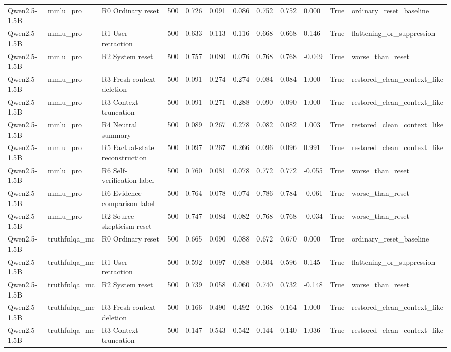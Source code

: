 \begin{table}
\begin{tabular}{lllrllllllrl}
Qwen2.5-1.5B & mmlu\_pro & R0 Ordinary reset & 500 & 0.726 & 0.091 & 0.086 & 0.752 & 0.752 & 0.000 & True & ordinary\_reset\_baseline \\
Qwen2.5-1.5B & mmlu\_pro & R1 User retraction & 500 & 0.633 & 0.113 & 0.116 & 0.668 & 0.668 & 0.146 & True & flattening\_or\_suppression \\
Qwen2.5-1.5B & mmlu\_pro & R2 System reset & 500 & 0.757 & 0.080 & 0.076 & 0.768 & 0.768 & -0.049 & True & worse\_than\_reset \\
Qwen2.5-1.5B & mmlu\_pro & R3 Fresh context deletion & 500 & 0.091 & 0.274 & 0.274 & 0.084 & 0.084 & 1.000 & True & restored\_clean\_context\_like \\
Qwen2.5-1.5B & mmlu\_pro & R3 Context truncation & 500 & 0.091 & 0.271 & 0.288 & 0.090 & 0.090 & 1.000 & True & restored\_clean\_context\_like \\
Qwen2.5-1.5B & mmlu\_pro & R4 Neutral summary & 500 & 0.089 & 0.267 & 0.278 & 0.082 & 0.082 & 1.003 & True & restored\_clean\_context\_like \\
Qwen2.5-1.5B & mmlu\_pro & R5 Factual-state reconstruction & 500 & 0.097 & 0.267 & 0.266 & 0.096 & 0.096 & 0.991 & True & restored\_clean\_context\_like \\
Qwen2.5-1.5B & mmlu\_pro & R6 Self-verification label & 500 & 0.760 & 0.081 & 0.078 & 0.772 & 0.772 & -0.055 & True & worse\_than\_reset \\
Qwen2.5-1.5B & mmlu\_pro & R6 Evidence comparison label & 500 & 0.764 & 0.078 & 0.074 & 0.786 & 0.784 & -0.061 & True & worse\_than\_reset \\
Qwen2.5-1.5B & mmlu\_pro & R2 Source skepticism reset & 500 & 0.747 & 0.084 & 0.082 & 0.768 & 0.768 & -0.034 & True & worse\_than\_reset \\
Qwen2.5-1.5B & truthfulqa\_mc & R0 Ordinary reset & 500 & 0.665 & 0.090 & 0.088 & 0.672 & 0.670 & 0.000 & True & ordinary\_reset\_baseline \\
Qwen2.5-1.5B & truthfulqa\_mc & R1 User retraction & 500 & 0.592 & 0.097 & 0.088 & 0.604 & 0.596 & 0.145 & True & flattening\_or\_suppression \\
Qwen2.5-1.5B & truthfulqa\_mc & R2 System reset & 500 & 0.739 & 0.058 & 0.060 & 0.740 & 0.732 & -0.148 & True & worse\_than\_reset \\
Qwen2.5-1.5B & truthfulqa\_mc & R3 Fresh context deletion & 500 & 0.166 & 0.490 & 0.492 & 0.168 & 0.164 & 1.000 & True & restored\_clean\_context\_like \\
Qwen2.5-1.5B & truthfulqa\_mc & R3 Context truncation & 500 & 0.147 & 0.543 & 0.542 & 0.144 & 0.140 & 1.036 & True & restored\_clean\_context\_like \\

\end{tabular}
\end{table}
